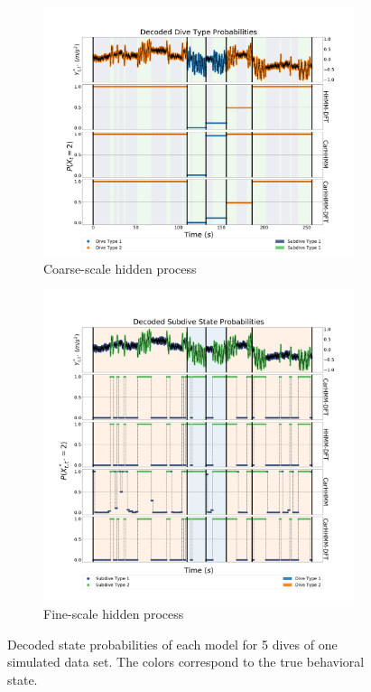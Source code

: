 \begin{figure}[ht]
    \centering
    \begin{subfigure}[t]{1.0\textwidth}
        \centering
        \includegraphics[width=4.7in]{../Plots/Posterior_Coarse_States.png}
        \caption{Coarse-scale hidden process}
    \end{subfigure}
    \newline
    \begin{subfigure}[t]{1.0\textwidth}
        \centering
        \includegraphics[width=4.7in]{../Plots/Posterior_Fine_States.png}
        \caption{Fine-scale hidden process}
    \end{subfigure}
	\caption{Decoded state probabilities of each model for 5 dives of one simulated data set. The colors correspond to the true behavioral state.}
	\label{fig:acc}
\end{figure}


